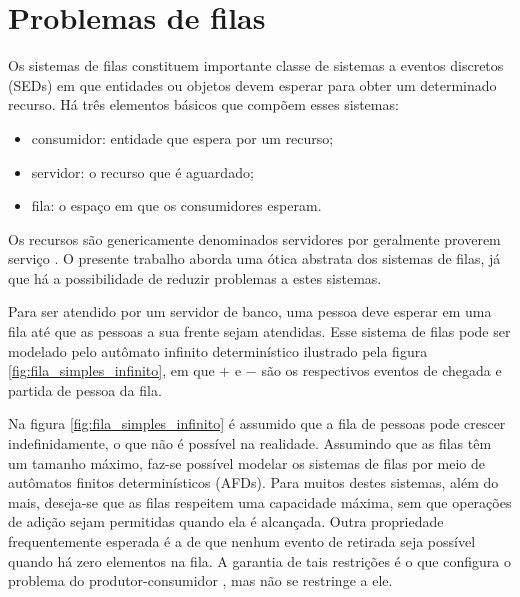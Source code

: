 \chapter{Problemas de filas}
\label{cap:filas}

Os sistemas de filas constituem importante classe de sistemas a eventos discretos (\acs{SED}s) em que entidades ou objetos devem esperar para obter um determinado recurso. Há três elementos básicos que compõem esses sistemas: \begin{itemize}
	\item consumidor: entidade que espera por um recurso;
	\item servidor: o recurso que é aguardado;
	\item fila: o espaço em que os consumidores esperam.
\end{itemize} Os recursos são genericamente denominados servidores por geralmente proverem serviço \cite{cassandras}. O presente trabalho aborda uma ótica abstrata dos sistemas de filas, já que há a possibilidade de reduzir problemas a estes sistemas.

Para ser atendido por um servidor de banco, uma pessoa deve esperar em uma fila até que as pessoas a sua frente sejam atendidas. Esse sistema de filas pode ser modelado pelo autômato infinito determinístico ilustrado pela figura \ref{fig:fila_simples_infinito}, em que $+$ e $-$ são os respectivos eventos de chegada e partida de pessoa da fila.


Na figura \ref{fig:fila_simples_infinito} é assumido que a fila de pessoas pode crescer indefinidamente, o que não é possível na realidade. Assumindo que as filas têm um tamanho máximo, faz-se possível modelar os sistemas de filas por meio de autômatos finitos determinísticos (AFDs). Para muitos destes sistemas, além do mais, deseja-se que as filas respeitem uma capacidade máxima, sem que operações de adição sejam permitidas quando ela é alcançada. Outra propriedade frequentemente esperada é a de que nenhum evento de retirada seja possível quando há zero elementos na fila. A garantia de tais restrições é o que configura o problema do produtor-consumidor \cite{mehmood}, mas não se restringe a ele.

